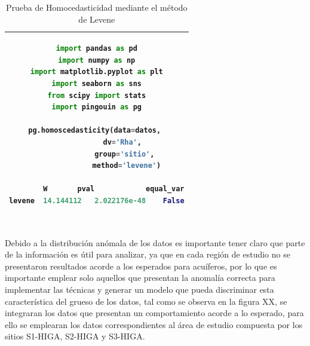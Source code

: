 \documentclass[sn-mathphys,Numbered]{sn-jnl}%
\theoremstyle{thmstyleone}%
\theoremstyle{thmstyletwo}%
\theoremstyle{thmstylethree}%
\begin{document}
\begin{table}[t]
	\begin{center}
		\begin{tabular}{|c|}
			\hline
			{\small \begin{lstlisting}[language=python]
import pandas as pd
import numpy as np
import matplotlib.pyplot as plt
import seaborn as sns
from scipy import stats
import pingouin as pg
				
pg.homoscedasticity(data=datos, 
			dv='Rha',
			 group='sitio',
			  method='levene')
				
        W		pval        	equal_var
levene	14.144112	2.022176e-48	False
					
			\end{lstlisting}}\\
		
	
			\hline
		\end{tabular}
		\caption{Prueba de Homocedasticidad mediante el método de Levene}
		\label{tab:Homocedasticidad}
	\end{center}
\end{table}

Debido a la distribución anómala de los datos es importante tener claro que parte de la información es útil para analizar, ya que en cada región de estudio no se presentaron resultados acorde a los esperados para acuíferos, por lo que es importante emplear solo aquellos que presentan la anomalía correcta para implementar las técnicas y generar un modelo que pueda discriminar esta característica del grueso de los datos, tal como se observa en la figura XX, se integraran los datos que presentan un comportamiento acorde a lo esperado, para ello se emplearan los datos correspondientes al área de estudio compuesta por los sitios S1-HIGA, S2-HIGA y S3-HIGA.
\end{document}
